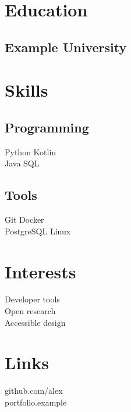 \documentclass[]{deedy-resume-openfont}
\begin{document}
\vspace{10pt}
\noindent\begin{minipage}[t]{0.31\textwidth}
\section{Education}\subsection{Example University}
\sectionsep
\section{Skills}\subsection{Programming}Python \textbullet{} Kotlin\\Java \textbullet{} SQL\\\sectionsep
\subsection{Tools}Git \textbullet{} Docker\\PostgreSQL \textbullet{} Linux\sectionsep
\section{Interests}Developer tools\\Open research\\Accessible design\sectionsep
\section{Links}github.com/alex\\portfolio.example
\end{minipage}\hfill\begin{minipage}[t]{0.65\textwidth}

\end{minipage}
\end{document}
